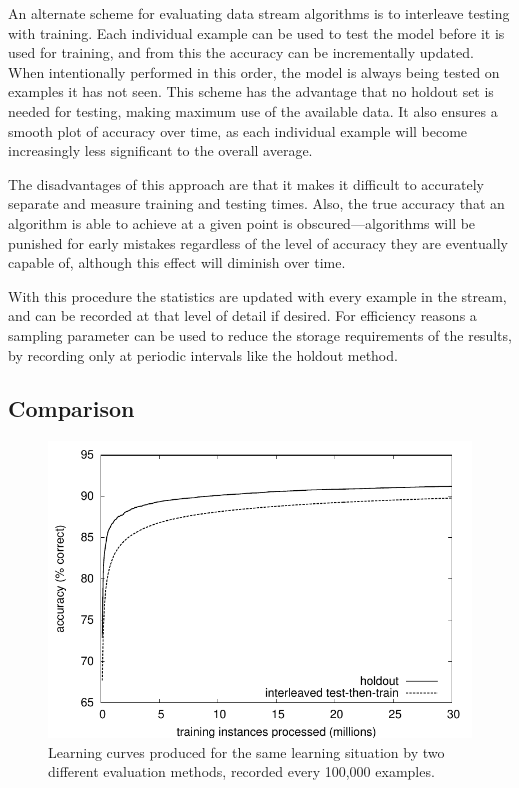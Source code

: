 An alternate scheme for evaluating data stream algorithms is to interleave testing with training. Each individual example can be used to test the model before it is used for training, and from this the accuracy can be incrementally updated. When intentionally performed in this order, the model is always being tested on examples it has not seen. This scheme has the advantage that no holdout set is needed for testing, making maximum use of the available data. It also ensures a smooth plot of accuracy over time, as each individual example will become increasingly less significant to the overall average.

The disadvantages of this approach are that it makes it difficult to accurately separate and measure training and testing times. Also, the true accuracy that an algorithm is able to achieve at a given point is obscured---algorithms will be punished for early mistakes regardless of the level of accuracy they are eventually capable of, although this effect will diminish over time.

With this procedure the statistics are updated with every example in the stream, and can be recorded at that level of detail if desired. For efficiency reasons a sampling parameter can be used to reduce the storage requirements of the results, by recording only at periodic intervals like the holdout method.

\subsection{Comparison}

\begin{figure}
\includegraphics{figures/holdout_vs_interleaved}
\caption{Learning curves produced for the same learning situation by two different evaluation methods, recorded every 100,000 examples.}
\label{fig:holdout_vs_interleaved}
\end{figure}

